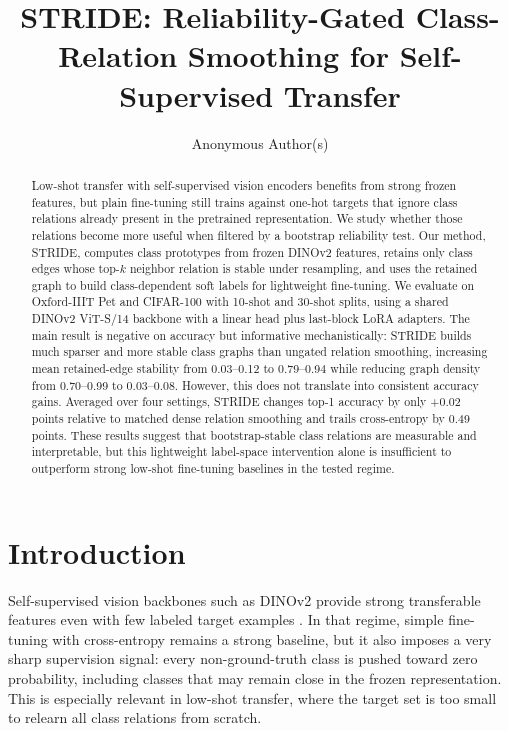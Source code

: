 \documentclass{article}
\title{STRIDE: Reliability-Gated Class-Relation Smoothing for Self-Supervised Transfer}
\author{Anonymous Author(s)}
\newcommand{\method}{STRIDE\xspace}
\begin{document}
\maketitle

\begin{abstract}
Low-shot transfer with self-supervised vision encoders benefits from strong frozen features, but plain fine-tuning still trains against one-hot targets that ignore class relations already present in the pretrained representation. We study whether those relations become more useful when filtered by a bootstrap reliability test. Our method, \method, computes class prototypes from frozen DINOv2 features, retains only class edges whose top-$k$ neighbor relation is stable under resampling, and uses the retained graph to build class-dependent soft labels for lightweight fine-tuning. We evaluate on Oxford-IIIT Pet and CIFAR-100 with 10-shot and 30-shot splits, using a shared DINOv2 ViT-S/14 backbone with a linear head plus last-block LoRA adapters. The main result is negative on accuracy but informative mechanistically: \method builds much sparser and more stable class graphs than ungated relation smoothing, increasing mean retained-edge stability from 0.03--0.12 to 0.79--0.94 while reducing graph density from 0.70--0.99 to 0.03--0.08. However, this does not translate into consistent accuracy gains. Averaged over four settings, \method changes top-1 accuracy by only +0.02 points relative to matched dense relation smoothing and trails cross-entropy by 0.49 points. These results suggest that bootstrap-stable class relations are measurable and interpretable, but this lightweight label-space intervention alone is insufficient to outperform strong low-shot fine-tuning baselines in the tested regime.
\end{abstract}

\section{Introduction}

Self-supervised vision backbones such as DINOv2 provide strong transferable features even with few labeled target examples \citep{oquab2024dinov2}. In that regime, simple fine-tuning with cross-entropy remains a strong baseline, but it also imposes a very sharp supervision signal: every non-ground-truth class is pushed toward zero probability, including classes that may remain close in the frozen representation. This is especially relevant in low-shot transfer, where the target set is too small to relearn all class relations from scratch.
\end{document}
